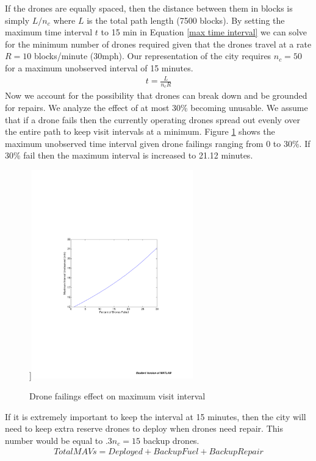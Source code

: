 \documentclass{article}
\begin{document}
\newline\indent If the drones are equally spaced, then the distance between them in blocks is simply $L/n_{c}$ where $L$ is the total path length (7500 blocks). By setting the maximum time interval $t$ to 15 min in Equation \ref{max time interval} we can solve for the minimum number of drones required given that the drones travel at a rate $R = 10$ blocks/minute (30mph). Our representation of the city requires $n_{c} = 50$ for a maximum unobserved interval of 15 minutes.
\begin{eqnarray}
t = \frac{L}{n_{c}R} \label{max time interval}
\end{eqnarray}
\newline\indent Now we account for the possibility that drones can break down and be grounded for repairs. We analyze the effect of at most 30\% becoming unusable. We assume that if a drone fails then the currently operating drones spread out evenly over the entire path to keep visit intervals at a minimum. Figure \ref{failed} shows the maximum unobserved time interval given drone failings ranging from 0 to 30\%. If 30\% fail then the maximum interval is increased to 21.12 minutes.
\begin{figure}[htb!]
    \centering]{{\includegraphics[width=7cm]{figures/failed_drones.pdf} }}%
    \caption{Drone failings effect on maximum visit interval}
   \label{failed}
\end{figure}
If it is extremely important to keep the interval at 15 minutes, then the city will need to keep extra reserve drones to deploy when drones need repair. This number would be equal to $.3n_{c} = 15$ backup drones.
\begin{eqnarray}
Total MAVs = Deployed + Backup Fuel + Backup Repair \label{totaldrones}
\end{eqnarray}
\end{document}
